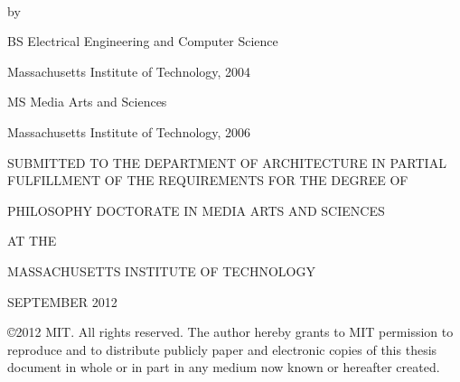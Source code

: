\thispagestyle{empty}

~

\vspace{5mm}

\begin{addmargin}[-1cm]{-3.5cm}
\begin{center}
    \begingroup
        \color{Maroon}\spacedallcaps{\myTitle}
    \endgroup

    by

    \spacedlowsmallcaps{\myName}

    \vspace{2mm}
    
{\small
    BS Electrical Engineering and Computer Science
    
    Massachusetts Institute of Technology, 2004
}
    
    \vspace{2mm}

{\small
    MS Media Arts and Sciences
    
    Massachusetts Institute of Technology, 2006
}
    
    \vspace{2mm}

{\small
SUBMITTED TO THE DEPARTMENT OF ARCHITECTURE IN PARTIAL
FULFILLMENT OF THE REQUIREMENTS FOR THE DEGREE OF
}

    \vspace{2mm}

{\small
PHILOSOPHY DOCTORATE IN MEDIA ARTS AND SCIENCES

AT THE

MASSACHUSETTS INSTITUTE OF TECHNOLOGY
}

    \vspace{2mm}

{\small
SEPTEMBER 2012
}

    \vspace{2mm}

{\small
\copyright 2012 MIT.  All rights reserved.
The author hereby grants to MIT permission to reproduce
and to distribute publicly paper and electronic
copies of this thesis document in whole or in part
in any medium now known or hereafter created.
}

\end{center}        


\end{addmargin}
